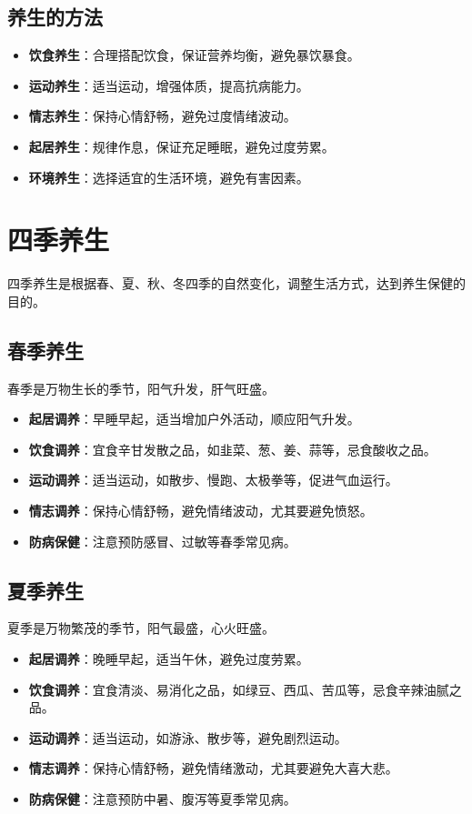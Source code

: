\documentclass[12pt,UTF8]{ctexbook}
\begin{document}
\subsection{养生的方法}

\begin{itemize}
\item \textbf{饮食养生}：合理搭配饮食，保证营养均衡，避免暴饮暴食。
\item \textbf{运动养生}：适当运动，增强体质，提高抗病能力。
\item \textbf{情志养生}：保持心情舒畅，避免过度情绪波动。
\item \textbf{起居养生}：规律作息，保证充足睡眠，避免过度劳累。
\item \textbf{环境养生}：选择适宜的生活环境，避免有害因素。
\end{itemize}

\section{四季养生}

四季养生是根据春、夏、秋、冬四季的自然变化，调整生活方式，达到养生保健的目的。

\subsection{春季养生}

春季是万物生长的季节，阳气升发，肝气旺盛。

\begin{itemize}
\item \textbf{起居调养}：早睡早起，适当增加户外活动，顺应阳气升发。
\item \textbf{饮食调养}：宜食辛甘发散之品，如韭菜、葱、姜、蒜等，忌食酸收之品。
\item \textbf{运动调养}：适当运动，如散步、慢跑、太极拳等，促进气血运行。
\item \textbf{情志调养}：保持心情舒畅，避免情绪波动，尤其要避免愤怒。
\item \textbf{防病保健}：注意预防感冒、过敏等春季常见病。
\end{itemize}

\subsection{夏季养生}

夏季是万物繁茂的季节，阳气最盛，心火旺盛。

\begin{itemize}
\item \textbf{起居调养}：晚睡早起，适当午休，避免过度劳累。
\item \textbf{饮食调养}：宜食清淡、易消化之品，如绿豆、西瓜、苦瓜等，忌食辛辣油腻之品。
\item \textbf{运动调养}：适当运动，如游泳、散步等，避免剧烈运动。
\item \textbf{情志调养}：保持心情舒畅，避免情绪激动，尤其要避免大喜大悲。
\item \textbf{防病保健}：注意预防中暑、腹泻等夏季常见病。
\end{itemize}
\end{document}
